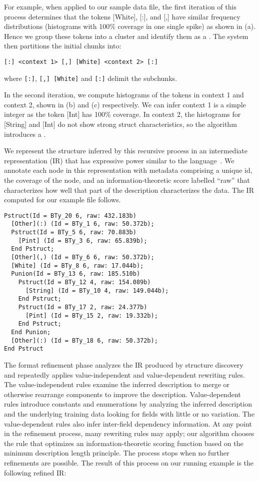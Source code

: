 \documentclass[preprint]{sig-alternate-sigmod08}
\begin{document}
For example, when applied to our sample data file, the first iteration of this
process determines that the tokens
[White], [:], and [,] have similar frequency distributions
(histograms with 100\% coverage in one single spike) as shown in (a).
Hence we group these tokens
into a cluster and identify them as a . 
The system then partitions the initial chunks into:

{\small
\begin{verbatim}
[:] <context 1> [,] [White] <context 2> [:]
\end{verbatim}
}
\noindent where \verb#[:]#, \verb#[,] [White]# and \verb#[:]# delimit
the subchunks.

In the second iteration, we compute histograms of the tokens in context 1 and
context 2, shown in (b) and (c) 
respectively. We can infer context 1 is a simple integer
as the token [Int] has 100\% coverage. In context 2,
the histograms for [String] and [Int] do not
show strong struct characteristics, so the algorithm introduces
a .  

We represent the structure inferred by this recursive process
in an intermediate representation (IR) that has 
expressive power similar to the \pads{} language~\cite{fisher+:popl06}.  
We annotate each node in this representation with metadata
comprising a unique id, the coverage of the node,
and an information-theoretic score labelled ``raw'' that characterizes
how well that part of the description characterizes the data.  
The IR computed for our example file follows.

{\small
\begin{verbatim}
Pstruct(Id = BTy_20 6, raw: 432.183b)
  [Other](:) (Id = BTy_1 6, raw: 50.372b);
  Pstruct(Id = BTy_5 6, raw: 70.883b)
    [Pint] (Id = BTy_3 6, raw: 65.839b);
  End Pstruct;
  [Other](,) (Id = BTy_6 6, raw: 50.372b);
  [White] (Id = BTy_8 6, raw: 17.044b);
  Punion(Id = BTy_13 6, raw: 185.510b)
    Pstruct(Id = BTy_12 4, raw: 154.089b)
      [String] (Id = BTy_10 4, raw: 149.044b);
    End Pstruct;
    Pstruct(Id = BTy_17 2, raw: 24.377b)
      [Pint] (Id = BTy_15 2, raw: 19.332b);
    End Pstruct;
  End Punion;
  [Other](:) (Id = BTy_18 6, raw: 50.372b);
End Pstruct
\end{verbatim}
}

The format refinement phase analyzes the IR produced by structure discovery
and repeatedly applies value-independent and value-dependent
rewriting rules. 
The value-independent rules examine the inferred description 
to merge or otherwise rearrange components to improve the description.
Value-dependent rules introduce constants and enumerations by
analyzing the inferred description and the underlying
training data looking for fields with little or no 
variation. The value-dependent rules also infer
inter-field dependency information.
At any point in the refinement process,
many rewriting rules may apply; our algorithm chooses the rule
that optimizes an information-theoretic
scoring function based on the minimum description length
principle. The process stops when no further refinements are possible.
The result of this process on our running example is the following
refined IR:
\end{document}
